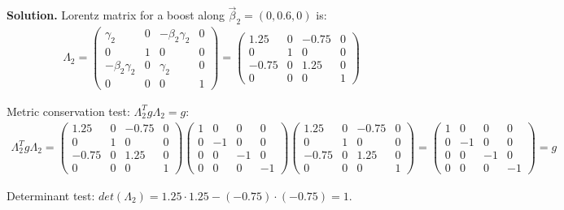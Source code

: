 \documentclass[11pt,a4paper]{article}
\newenvironment{solution}{\vspace{1cm} \par\textbf{Solution.} \vspace{1cm}}{\newpage}
\begin{document}
\begin{solution}
Lorentz matrix for a boost along $\vec{\beta}_2 = (0,0.6,0)$ is:
\begin{align*}
  \Lambda_2 = \begin{pmatrix}
    \gamma_2 & 0 & -\beta_2 \gamma_2 & 0 \\
    0 & 1 & 0 & 0 \\
    -\beta_2 \gamma_2 & 0 & \gamma_2 & 0 \\
    0 & 0 & 0 & 1
  \end{pmatrix} = \begin{pmatrix}
    1.25 & 0 & -0.75 & 0 \\
    0 & 1 & 0 & 0 \\
    -0.75 & 0 & 1.25 & 0 \\
    0 & 0 & 0 & 1
  \end{pmatrix}
\end{align*}

\vspace{0.5cm}

Metric conservation test: $\Lambda_2^T g \Lambda_2 = g$:
\begin{align*}
  \Lambda_2^T g \Lambda_2 = \begin{pmatrix}
    1.25 & 0 & -0.75 & 0 \\
    0 & 1 & 0 & 0 \\
    -0.75 & 0 & 1.25 & 0 \\
    0 & 0 & 0 & 1
  \end{pmatrix} \begin{pmatrix}
    1 & 0 & 0 & 0 \\
    0 & -1 & 0 & 0 \\
    0 & 0 & -1 & 0 \\
    0 & 0 & 0 & -1
  \end{pmatrix} \begin{pmatrix}
    1.25 & 0 & -0.75 & 0 \\
    0 & 1 & 0 & 0 \\
    -0.75 & 0 & 1.25 & 0 \\
    0 & 0 & 0 & 1
  \end{pmatrix} = \begin{pmatrix}
    1 & 0 & 0 & 0 \\
    0 & -1 & 0 & 0 \\
    0 & 0 & -1 & 0 \\
    0 & 0 & 0 & -1
  \end{pmatrix} = g
\end{align*}

Determinant test: $det(\Lambda_2) = 1.25 \cdot 1.25 - (-0.75) \cdot (-0.75) = 1$.


\end{solution}
\end{document}
